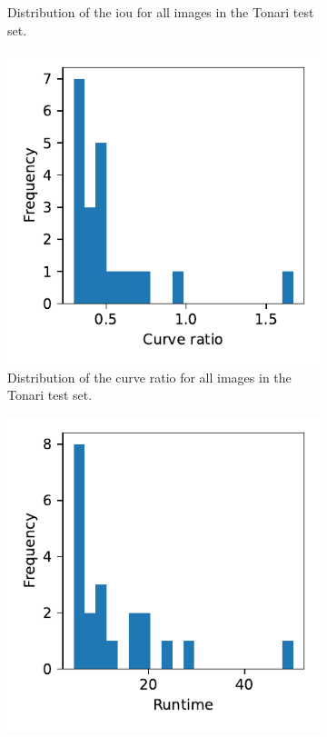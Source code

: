 \begin{figure}[h]
\begin{subfigure}{.3\textwidth}
        \caption{Distribution of the \gls{iou} for all images in the Tonari test set.}
        \label{fig:example.metric.distributions.raster_dist}
    \end{subfigure}
    \begin{subfigure}{.3\textwidth}
        \includegraphics[width=\textwidth]{graphics/eval/curve_ratio.pdf}
        \caption{Distribution of the curve ratio for all images in the Tonari test set.}
        \label{fig:example.metric.distributions.curve_ratio}
    \end{subfigure}
    \begin{subfigure}{.3\textwidth}
    \includegraphics[width=\textwidth]{graphics/eval/runtime.pdf}

\end{subfigure}
\end{figure}
